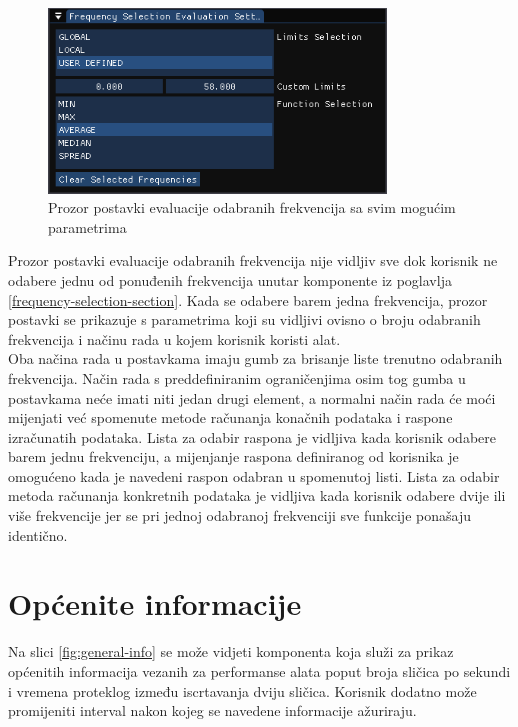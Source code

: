 \documentclass[times, utf8, diplomski]{fer}
\begin{document}
\begin{figure} [H]
	\centering
    \includegraphics[width=0.8\textwidth]{frq_sel_eval_settings.png}
    \caption{Prozor postavki evaluacije odabranih frekvencija sa svim mogućim parametrima}
    \label{fig:frq-sel-eval-settings}
\end{figure}

Prozor postavki evaluacije odabranih frekvencija nije vidljiv sve dok korisnik ne odabere jednu od ponuđenih frekvencija unutar komponente iz poglavlja \ref{frequency-selection-section}. Kada se odabere barem jedna frekvencija, prozor postavki se prikazuje s parametrima koji su vidljivi ovisno o broju odabranih frekvencija i načinu rada u kojem korisnik koristi alat.\\

Oba načina rada u postavkama imaju gumb za brisanje liste trenutno odabranih frekvencija. Način rada s preddefiniranim ograničenjima osim tog gumba u postavkama neće imati niti jedan drugi element, a normalni način rada će moći mijenjati već spomenute metode računanja konačnih podataka i raspone izračunatih podataka. Lista za odabir raspona je vidljiva kada korisnik odabere barem jednu frekvenciju, a mijenjanje raspona definiranog od korisnika je omogućeno kada je navedeni raspon odabran u spomenutoj listi. Lista za odabir metoda računanja konkretnih podataka je vidljiva kada korisnik odabere dvije ili više frekvencije jer se pri jednoj odabranoj frekvenciji sve funkcije ponašaju identično.


\section{Općenite informacije}

Na slici \ref{fig:general-info} se može vidjeti komponenta koja služi za prikaz općenitih informacija vezanih za performanse alata poput broja sličica po sekundi i vremena proteklog između iscrtavanja dviju sličica. Korisnik dodatno može promijeniti interval nakon kojeg se navedene informacije ažuriraju.
\end{document}
